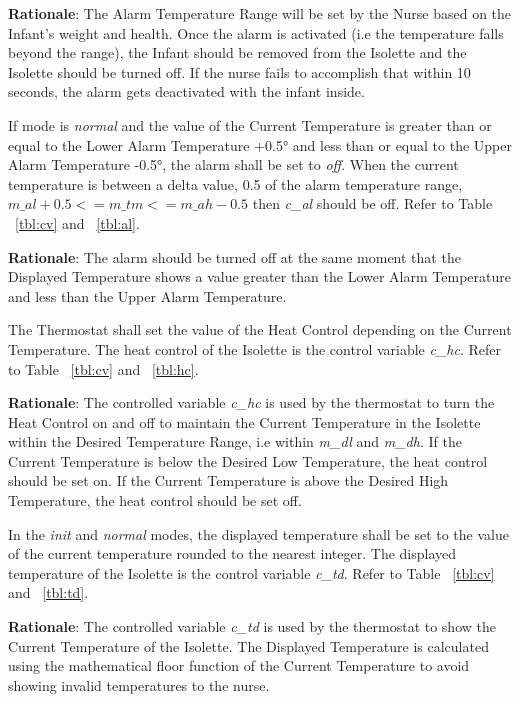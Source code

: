 \documentclass[fontsize=12pt,paper=letter,twoside]{scrartcl}
\begin{document}
\smallskip
\noindent \textbf{Rationale}: The Alarm Temperature Range will be set by the Nurse based on the Infant’s weight and health. Once the alarm is activated (i.e the temperature falls beyond the range), the Infant should be removed from the Isolette and the Isolette should be turned off. If the nurse fails to accomplish that within 10 seconds, the alarm gets deactivated with the infant inside.

\rdescription
{If mode is \emph{normal} and the value of the Current Temperature is greater than or equal to the Lower Alarm Temperature +0.5° and less than or equal to the Upper Alarm Temperature -0.5°, the alarm shall be set to \emph{off}.}
{When the current temperature is between a delta value, 0.5 of the alarm temperature range, $m\_al+0.5 <= m\_tm <= m\_ah - 0.5$ then \emph{c\_al} should be off. Refer to Table ~\ref{tbl:cv} and ~\ref{tbl:al}.}
\label{R5}

\smallskip
\noindent \textbf{Rationale}: The alarm should be turned off at the same moment that the Displayed Temperature shows a value greater than the Lower Alarm Temperature and less than the Upper Alarm Temperature.

\rdescription
{The Thermostat shall set the value of the Heat Control depending on the Current Temperature.}
{The heat control of the Isolette is the control variable \emph{c\_hc}. Refer to Table ~\ref{tbl:cv} and ~\ref{tbl:hc}.}
\label{R6}

\smallskip
\noindent \textbf{Rationale}: The controlled variable \emph{c\_hc} is used by the thermostat to turn the Heat Control on and off to maintain the Current Temperature in the Isolette within the Desired Temperature Range, i.e within \emph{m\_dl} and \emph{m\_dh}. If the Current Temperature is below the Desired Low Temperature, the heat control should be set on. If the Current Temperature is above the Desired High Temperature, the heat control should be set off.

\rdescription
{In the \emph{init} and \emph{normal} modes, the displayed temperature shall be set to the value of the current temperature rounded to the nearest integer.}
{The displayed temperature of the Isolette is the control variable \emph{c\_td}. Refer to Table ~\ref{tbl:cv} and ~\ref{tbl:td}.} %
\label{R7}

\smallskip
\noindent \textbf{Rationale}: The controlled variable \emph{c\_td} is used by the thermostat to show the Current Temperature of the Isolette. The Displayed Temperature is calculated using the mathematical floor function of the Current Temperature to avoid showing invalid temperatures to the nurse.
\end{document}

